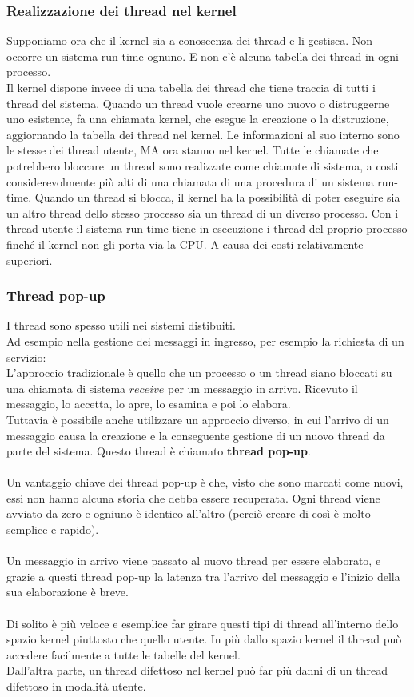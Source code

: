 \documentclass{article}
\begin{document}
\subsubsection{Realizzazione dei thread nel kernel}
Supponiamo ora che il kernel sia a conoscenza dei thread e li gestisca. Non occorre un sistema run-time ognuno. E non c’è alcuna tabella dei thread in ogni processo.
\\Il kernel dispone invece di una tabella dei thread che tiene traccia di tutti i thread del sistema. Quando un thread vuole crearne uno nuovo o distruggerne uno esistente, fa una chiamata kernel, che esegue la creazione o la distruzione, aggiornando la tabella dei thread nel kernel. Le informazioni al suo interno sono le stesse dei thread utente, MA ora stanno nel kernel. Tutte le chiamate che potrebbero bloccare un thread sono realizzate come chiamate di sistema, a costi considerevolmente più alti di una chiamata di una procedura di un sistema run-time. Quando un thread si blocca, il kernel ha la possibilità di poter eseguire sia un altro thread dello stesso processo sia un thread di un diverso processo. Con i thread utente il sistema run time tiene in esecuzione i thread del proprio processo finché il kernel non gli porta via la CPU. A causa dei costi relativamente superiori.


\subsubsection{Thread pop-up}
I thread sono spesso utili nei sistemi distibuiti. 
\\
Ad esempio nella gestione dei messaggi in ingresso, per esempio la richiesta di un servizio:
\\L'approccio tradizionale è quello che un processo o un thread siano bloccati su una chiamata di sistema $receive$ per un messaggio in arrivo. Ricevuto il messaggio, lo accetta, lo apre, lo esamina e poi lo elabora.
\\
Tuttavia è possibile anche utilizzare un approccio diverso, in cui l'arrivo di un messaggio causa la creazione e la conseguente gestione di un nuovo thread da parte del sistema. Questo thread è chiamato \textbf{thread pop-up}.
\\
\\
Un vantaggio chiave dei thread pop-up è che, visto che sono marcati come nuovi, essi non hanno alcuna storia che debba essere recuperata. Ogni thread viene avviato da zero e ogniuno è identico all'altro (perciò creare di così è molto semplice e rapido).
\\
\\
Un messaggio in arrivo viene passato al nuovo thread per essere elaborato, e grazie a questi thread pop-up 
la latenza tra l'arrivo del messaggio e l'inizio della sua elaborazione è breve.
\\
\\
Di solito è più veloce e esemplice far girare questi tipi di thread all'interno dello spazio kernel piuttosto che quello utente. In più dallo spazio kernel il thread può accedere facilmente a tutte le tabelle del kernel.
\\
Dall'altra parte, un thread difettoso nel kernel può far più danni di un thread difettoso in modalità utente.
\end{document}
